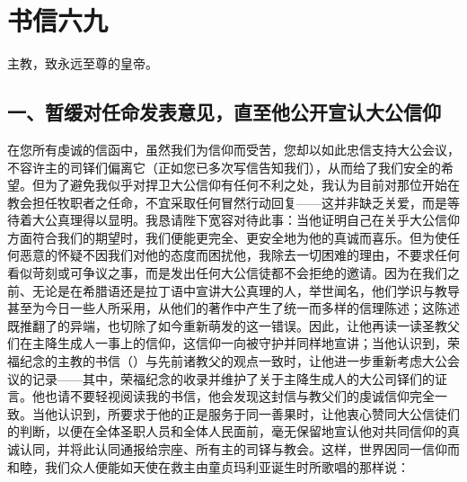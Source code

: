 

\section{书信六九}

主教，致永远至尊的皇帝。\par


\subsection{一、暂缓对任命发表意见，直至他公开宣认大公信仰}

在您所有虔诚的信函中，虽然我们为信仰而受苦，您却以如此忠信支持大公会议，不容许主的司铎们偏离它（正如您已多次写信告知我们），从而给了我们安全的希望。但为了避免我似乎对捍卫大公信仰有任何不利之处，我认为目前对那位开始在教会担任牧职者之任命，不宜采取任何冒然行动回复——这并非缺乏关爱，而是等待着大公真理得以显明。我恳请陛下宽容对待此事：当他证明自己在关乎大公信仰方面符合我们的期望时，我们便能更完全、更安全地为他的真诚而喜乐。但为使任何恶意的怀疑不因我们对他的态度而困扰他，我除去一切困难的理由，不要求任何看似苛刻或可争议之事，而是发出任何大公信徒都不会拒绝的邀请。因为在我们之前、无论是在希腊语还是拉丁语中宣讲大公真理的人，举世闻名，他们学识与教导甚至为今日一些人所采用，从他们的著作中产生了统一而多样的信理陈述；这陈述既推翻了的异端，也切除了如今重新萌发的这一错误。因此，让他再读一读圣教父们在主降生成人一事上的信仰，这信仰一向被守护并同样地宣讲；当他认识到，荣福纪念的主教的书信（）与先前诸教父的观点一致时，让他进一步重新考虑大公会议的记录——其中，荣福纪念的收录并维护了关于主降生成人的大公司铎们的证言。他也请不要轻视阅读我的书信，他会发现这封信与教父们的虔诚信仰完全一致。当他认识到，所要求于他的正是服务于同一善果时，让他衷心赞同大公信徒们的判断，以便在全体圣职人员和全体人民面前，毫无保留地宣认他对共同信仰的真诚认同，并将此认同通报给宗座、所有主的司铎与教会。这样，世界因同一信仰而和睦，我们众人便能如天使在救主由童贞玛利亚诞生时所歌唱的那样说：\par

